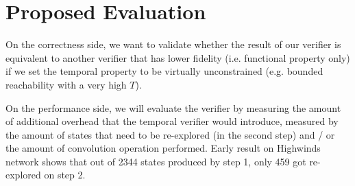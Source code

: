 \documentclass[10pt,sigconf,letterpaper,anonymous,nonacm]{acmart}
\begin{document}


\section{Proposed Evaluation}
On the correctness side, we want to validate whether the result of our verifier is equivalent to 
another verifier that has lower fidelity (i.e. functional property only) if we set the temporal 
property to be virtually unconstrained (e.g. bounded reachability with a very high $T$).

On the performance side, we will evaluate the verifier by measuring the amount of additional 
overhead that the temporal verifier would introduce, measured by the amount of states that 
need to be re-explored (in the second step) and / or the amount of convolution operation performed. 
Early result on Highwinds \cite{knight2011internet} network shows that out of 2344 states 
produced by step 1, only 459 got re-explored on step 2.



\end{document}
